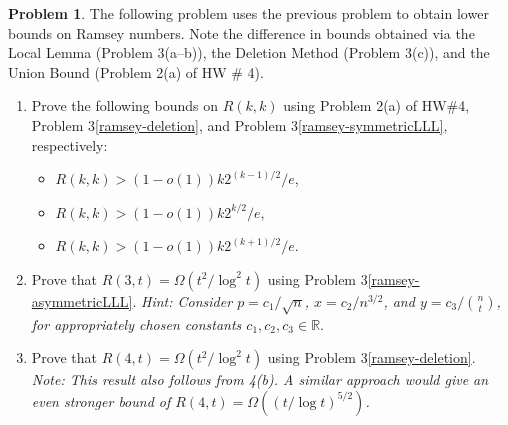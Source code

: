\documentclass[11pt, letter]{amsart}
\theoremstyle{definition}
\newtheorem{problem}{Problem}[]
\begin{document}
\begin{problem}The following problem uses the previous problem to obtain lower bounds on Ramsey numbers.  Note the difference in bounds obtained via the Local Lemma (Problem 3(a--b)), the Deletion Method (Problem 3(c)), and the Union Bound (Problem 2(a) of HW \# 4).
  \begin{enumerate}[label=(\alph*)]
  \item Prove the following bounds on $R(k,k)$ using Problem 2(a) of HW\#4, Problem 3\ref{ramsey-deletion}, and Problem 3\ref{ramsey-symmetricLLL}, respectively:
    \begin{itemize}
    \item $R(k,k) > (1 - o(1))k2^{(k-1)/2} / e$,


    
    \item $R(k,k) > (1 - o(1))k2^{k/2} / e$,

    
        
    \item $R(k,k) > (1 - o(1))k2^{(k+1)/2} / e$.

    
    
    \end{itemize}
  \item Prove that $R(3, t) = \Omega(t^2 / \log^2 t)$ using Problem 3\ref{ramsey-asymmetricLLL}.  \textit{Hint: Consider $p = c_1 / \sqrt n$, $x = c_2 / n^{3/2}$, and $y = c_3 / \binom{n}{t}$, for appropriately chosen constants $c_1, c_2, c_3 \in \mathbb  R$}.

    
  
  \item Prove that $R(4, t) = \Omega(t^2 / \log^2 t)$ using Problem 3\ref{ramsey-deletion}.  \textit{Note: This result also follows from 4(b).  A similar approach would give an even stronger bound of $R(4,t) = \Omega((t / \log t)^{5/2})$.}
  \end{enumerate}
\end{problem}
\end{document}
